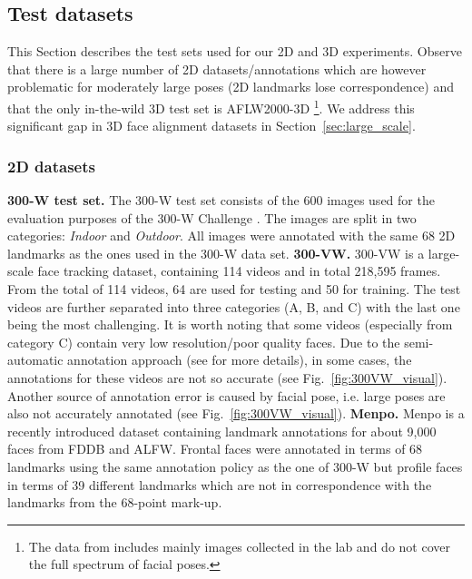 	\subsection{Test datasets}

	This Section describes the test sets used for our 2D and 3D experiments. Observe that there is a large number of 2D datasets/annotations which are however  problematic for moderately large poses (2D landmarks lose correspondence) and that the only in-the-wild 3D test set is AFLW2000-3D \cite{zhu2016face} \footnote{The data from \cite{jeni2016first} includes mainly images collected in the lab and do not cover the full spectrum of facial poses.}. We address this significant gap in 3D face alignment datasets in Section~\ref{sec:large_scale}. 

	\subsubsection{2D datasets}

	\textbf{300-W test set.} The 300-W test set consists of the 600 images used for the evaluation purposes of the 300-W Challenge \cite{sagonas2016300}. The images are split in two categories: \textit{Indoor} and \textit{Outdoor}. All images were annotated with the same 68 2D landmarks as the ones used in the 300-W data set. 
	\textbf{300-VW.} 300-VW\cite{shen2015first} is a large-scale face tracking dataset, containing 114 videos and in total 218,595 frames. From the total of 114 videos, 64 are used for testing and 50 for training.  The test videos are further separated into three categories (A, B, and C) with the last one being the most challenging. It is worth noting that some videos (especially from category C) contain very low resolution/poor quality faces. Due to the semi-automatic annotation approach (see \cite{shen2015first} for more details), in some cases, the annotations for these videos are not so accurate (see Fig.~\ref{fig:300VW_visual}). Another source of annotation error is caused by facial pose, i.e. large poses are also not accurately annotated (see Fig.~\ref{fig:300VW_visual}). 
	\textbf{Menpo.} Menpo is a recently introduced dataset \cite{menpo} containing landmark annotations for about 9,000 faces from FDDB \cite{jain2010fddb} and ALFW. Frontal faces were annotated in terms of 68 landmarks using the same annotation policy as the one of 300-W but profile faces in terms of 39 different landmarks which are not in correspondence with the landmarks from the 68-point mark-up. 

